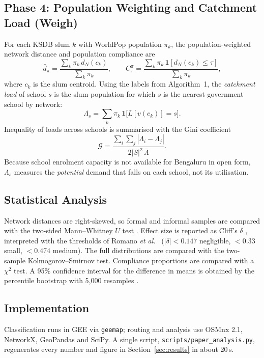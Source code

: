 \documentclass[conference]{IEEEtran}
\begin{document}
\subsection{Phase 4: Population Weighting and Catchment Load (Weigh)}
For each KSDB slum $k$ with WorldPop population $\pi_k$, the population-weighted network distance and population compliance are
\begin{equation}
\bar d_\pi=\frac{\sum_k \pi_k\, d_N(c_k)}{\sum_k \pi_k},\qquad
C^\pi_\tau=\frac{\sum_k \pi_k\,\mathbf{1}[d_N(c_k)\le\tau]}{\sum_k \pi_k},
\end{equation}
where $c_k$ is the slum centroid. Using the labels from Algorithm~1, the \emph{catchment load} of school $s$ is the slum population for which $s$ is the nearest government school by network:
\begin{equation}
\Lambda_s=\sum_k \pi_k\,\mathbf{1}\big[L[v(c_k)]=s\big].
\end{equation}
Inequality of loads across schools is summarised with the Gini coefficient
\begin{equation}
\mathcal{G}=\frac{\sum_{i}\sum_{j}|\Lambda_i-\Lambda_j|}{2|S|^2\,\bar\Lambda}.
\end{equation}
Because school enrolment capacity is not available for Bengaluru in open form, $\Lambda_s$ measures the \emph{potential} demand that falls on each school, not its utilisation.

\subsection{Statistical Analysis}
Network distances are right-skewed, so formal and informal samples are compared with the two-sided Mann--Whitney $U$ test \cite{mann1947}. Effect size is reported as Cliff's $\delta$ \cite{cliff1993}, interpreted with the thresholds of Romano \textit{et al.}\ \cite{romano2006} ($|\delta|<0.147$ negligible, $<0.33$ small, $<0.474$ medium). The full distributions are compared with the two-sample Kolmogorov--Smirnov test. Compliance proportions are compared with a $\chi^2$ test. A 95\% confidence interval for the difference in means is obtained by the percentile bootstrap with 5,000 resamples \cite{efron1993}.

\subsection{Implementation}
Classification runs in GEE via \texttt{geemap}; routing and analysis use OSMnx 2.1, NetworkX, GeoPandas and SciPy. A single script, \texttt{scripts/paper\_analysis.py}, regenerates every number and figure in Section~\ref{sec:results} in about 20\,s.
\end{document}
